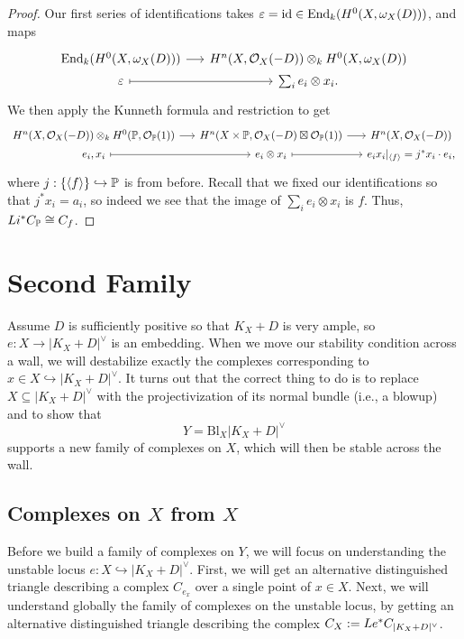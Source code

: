 \documentclass[12pt]{article}
\newcommand{\Bl}{\mathrm{Bl}}
\begin{document}
\begin{proof}
    Our first series of identifications takes $\eps=\id\in \End_k(H^0(X,\omega_X(D)))$, and maps
    \[\begin{tikzcd}[column sep=0.5cm, row sep=0cm]
        \End_k(H^0(X,\omega_X(D))) \rar & H^n(X,\cO_X(-D)) \otimes_k H^0(X,\omega_X(D))\\
        \eps \rar[mapsto] & \sum_i e_i \otimes x_i.
    \end{tikzcd}\]
    We then apply the Kunneth formula and restriction to get
    \[\begin{tikzcd}[column sep=0.5cm, row sep=0cm]
    H^n(X,\cO_X(-D)) \otimes_k H^0(\P,\cO_\P(1)) \rar & H^n(X\times \P,\cO_X(-D)\boxtimes \cO_\P(1)) \rar & H^n(X,\cO_X(-D))\\
    e_i,x_i \ar[r,mapsto] & e_i\otimes x_i \ar[r,mapsto] & e_i x_i|_{\<f\>} = j^*x_i \cdot e_i,
    \end{tikzcd}\]
    where $j:\{\<f\>\}\hookrightarrow \P$ is from before. Recall that we fixed our identifications so that $j^*x_i = a_i$, so indeed we see that the image of $\sum_i e_i\otimes x_i$ is $f$. Thus, $Li^* C_\P \cong C_f$.
\end{proof}


\section{Second Family}

Assume $D$ is sufficiently positive so that $K_X+D$ is very ample, so $e:X\to |K_X+D|^\vee$ is an embedding. When we move our stability condition across a wall, we will destabilize exactly the complexes corresponding to $x\in X \hookrightarrow |K_X+D|^\vee$. It turns out that the correct thing to do is to replace $X\subseteq |K_X+D|^\vee$ with the projectivization of its normal bundle (i.e., a blowup) and to show that
\[Y=\Bl_X |K_X+D|^\vee\]
supports a new family of complexes on $X$, which will then be stable across the wall.

\subsection{Complexes on $X$ from $X$}

Before we build a family of complexes on $Y$, we will focus on understanding the unstable locus $e:X\hookrightarrow |K_X+D|^\vee$. First, we will get an alternative distinguished triangle describing a complex $C_{e_x}$ over a single point of $x\in X$. Next, we will understand globally the family of complexes on the unstable locus, by getting an alternative distinguished triangle describing the complex $C_X\defeq Le^* C_{|K_X+D|^\vee}$.
\end{document}
